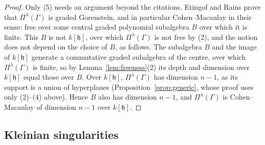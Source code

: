\documentclass[11pt]{amsart}
\numberwithin{table}{section}
\numberwithin{figure}{section}
\numberwithin{equation}{section}
\theoremstyle{definition}
\theoremstyle{plain}
\newcommand{\h}{\mathfrak{h}}
\begin{document}
\begin{proof}
Only (5) needs an argument beyond the citations. Etingof and Rains prove that $\Pi^\lambda(\Gamma)$ is graded Gorenstein, and in particular Cohen--Macaulay in their sense: free over some central graded polynomial subalgebra $B$ over which it is finite. This $B$ is not $k[\h]$, over which $\Pi^\lambda(\Gamma)$ is not free by (2), and the notion does not depend on the choice of $B$, as follows. The subalgebra $B$ and the image of $k[\h]$ generate a commutative graded subalgebra of the centre, over which $\Pi^\lambda(\Gamma)$ is finite, so by Lemma~\ref{lem:freeness}(2) its depth and dimension over $k[\h]$ equal those over $B$. Over $k[\h]$, $\Pi^\lambda(\Gamma)$ has dimension $n - 1$, as its support is a union of hyperplanes (Proposition~\ref{prop:generic}, whose proof uses only (2)--(4) above). Hence $B$ also has dimension $n - 1$, and $\Pi^\lambda(\Gamma)$ is Cohen--Macaulay of dimension $n - 1$ over $k[\h]$.
\end{proof}

\subsection{Kleinian singularities}\label{ss:kleinian}
\end{document}
